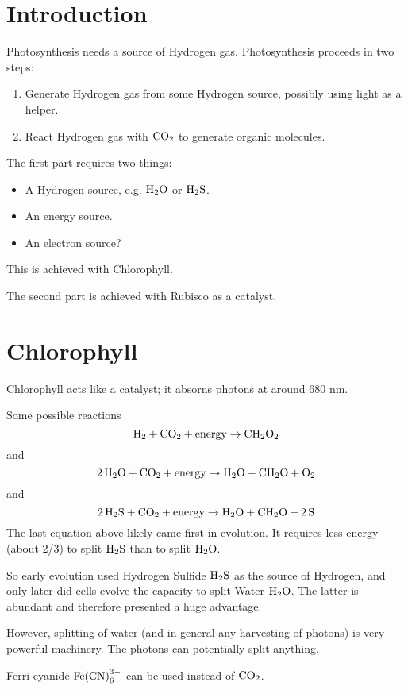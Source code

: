 \documentclass[a4paper,14pt]{extarticle}
\def\H{{\rm H}}
\def\O{{\rm O}}
\def\N{{\rm N}}
\def\C{{\rm C}}
\def\Fe{{\rm Fe}}
\def\S{{\rm S}}
\begin{document}

\section{Introduction}

Photosynthesis needs a source of Hydrogen gas.
Photosynthesis proceeds in two steps:
\begin{enumerate}
    \item Generate Hydrogen gas from some Hydrogen source, possibly using light as a helper.
    \item React Hydrogen gas with $\C\O_2$ to generate organic molecules.
\end{enumerate}
The first part requires two things:
\begin{itemize}
    \item A Hydrogen source, e.g. $\H_2\O$ or $\H_2\S$.
    \item An energy source.
    \item An electron source?
\end{itemize}
This is achieved with Chlorophyll.

The second part is achieved with Rubisco as a catalyst.

\section{Chlorophyll}

Chlorophyll acts like a catalyst; it absorns photons at around 680 nm.

Some possible reactions
\[
    \H_2 + \C\O_2 + \text{energy} \rightarrow \C\H_2\O_2
\]
and
\[
    2\,\H_2\O + \C\O_2 + \text{energy} \rightarrow \H_2\O + \C\H_2\O + \O_2
\]
and
\[
    2\,\H_2\S + \C\O_2 + \text{energy} \rightarrow \H_2\O + \C\H_2\O + 2\,\S
\]
The last equation above likely came first in evolution. It requires less energy (about 2/3) to split $\H_2\S$
than to split $\H_2\O$.

So early evolution used Hydrogen Sulfide $\H_2\S$ as the source of Hydrogen, and only later did
cells evolve the capacity to split Water $\H_2\O$. The latter is abundant and therefore presented a huge advantage.

However, splitting of water (and in general any harvesting of photons) is very powerful machinery. The photons
can potentially split anything.

Ferri-cyanide $\Fe{(\C\N)}_6^{3-}$ can be used instead of $\C\O_2$.
\end{document}
